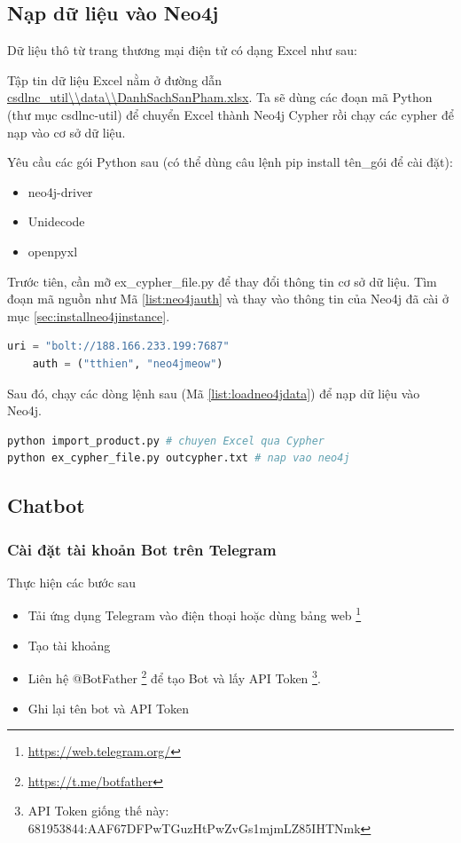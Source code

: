 \subsection{Nạp dữ liệu vào Neo4j}

Dữ liệu thô từ trang thương mại điện tử có dạng Excel như sau: 


Tập tin dữ liệu Excel nằm ở đường dẫn \url{csdlnc_util\\data\\DanhSachSanPham.xlsx}. Ta sẽ dùng các đoạn mã Python (thư mục csdlnc-util) để chuyển Excel thành Neo4j Cypher rồi chạy các cypher để nạp vào cơ sở dữ liệu. 

Yêu cầu các gói Python sau (có thể dùng câu lệnh pip install tên\_gói để cài đặt): 

\begin{itemize}
\item neo4j-driver
\item Unidecode 
\item openpyxl
\end{itemize}

Trước tiên, cần mỡ ex\_cypher\_file.py để thay đổi thông tin cơ sở dữ liệu. Tìm đoạn mã nguồn như Mã \ref{list:neo4jauth} và thay vào thông tin của Neo4j đã cài ở mục \ref{sec:installneo4jinstance}.

\begin{lstlisting}[language=python,caption={Thông tin Neo4j},label={list:neo4jauth}]
    uri = "bolt://188.166.233.199:7687"
    auth = ("tthien", "neo4jmeow")
\end{lstlisting}

Sau đó, chạy các dòng lệnh sau (Mã \ref{list:loadneo4jdata}) để nạp dữ liệu vào Neo4j.

\begin{lstlisting}[language=bash,caption={Cài Neo4j},label={list:loadneo4jdata}]
python import_product.py # chuyen Excel qua Cypher
python ex_cypher_file.py outcypher.txt # nap vao neo4j 
\end{lstlisting}

\subsection{Chatbot}
\subsubsection{Cài đặt tài khoản Bot trên Telegram}
Thực hiện các bước sau
\begin{itemize}
\item Tải ứng dụng Telegram vào điện thoại hoặc dùng bảng web \footnote{\url{https://web.telegram.org/}}
\item Tạo tài khoảng 
\item Liên hệ @BotFather \footnote{\url{https://t.me/botfather}} để tạo Bot và lấy API Token \footnote{API Token giống thế này: 681953844:AAF67DFPwTGuzHtPwZvGs1mjmLZ85IHTNmk}. 
\item Ghi lại tên bot và API Token 
\end{itemize}

